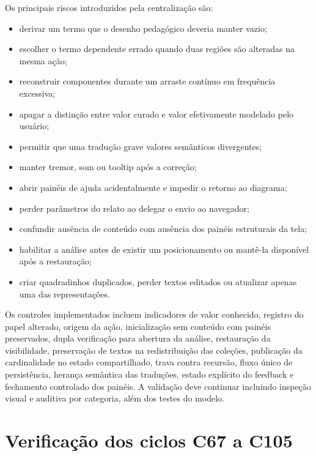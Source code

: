 \documentclass[12pt,a4paper]{article}
\begin{document}
Os principais riscos introduzidos pela centralização são:
\begin{itemize}[noitemsep]
  \item derivar um termo que o desenho pedagógico deveria manter vazio;
  \item escolher o termo dependente errado quando duas regiões são alteradas na mesma ação;
  \item reconstruir componentes durante um arraste contínuo em frequência excessiva;
  \item apagar a distinção entre valor curado e valor efetivamente modelado pelo usuário;
  \item permitir que uma tradução grave valores semânticos divergentes;
  \item manter tremor, som ou tooltip após a correção;
  \item abrir painéis de ajuda acidentalmente e impedir o retorno ao diagrama;
  \item perder parâmetros do relato ao delegar o envio ao navegador;
  \item confundir ausência de conteúdo com ausência dos painéis estruturais da tela;
  \item habilitar a análise antes de existir um posicionamento ou mantê-la disponível após a restauração;
  \item criar quadradinhos duplicados, perder textos editados ou atualizar apenas uma das representações.
\end{itemize}

Os controles implementados incluem indicadores de valor conhecido, registro do papel alterado, origem da ação, inicialização sem conteúdo com painéis preservados, dupla verificação para abertura da análise, restauração da visibilidade, preservação de textos na redistribuição das coleções, publicação da cardinalidade no estado compartilhado, trava contra recursão, fluxo único de persistência, herança semântica das traduções, estado explícito do feedback e fechamento controlado dos painéis. A validação deve continuar incluindo inspeção visual e auditiva por categoria, além dos testes do modelo.

\section{Verificação dos ciclos C67 a C105}
\end{document}
